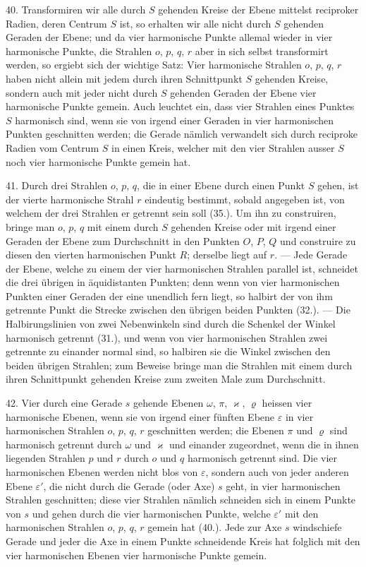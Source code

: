 40. Transformiren wir alle durch $S$ gehenden Kreise
der Ebene mittelst reciproker Radien, deren Centrum $S$ ist,
so erhalten wir alle nicht durch $S$ gehenden Geraden der
Ebene; und da vier harmonische Punkte allemal wieder in
vier harmonische Punkte, die Strahlen $o$, $p$, $q$, $r$ aber in sich
selbst transformirt werden, so ergiebt sich der wichtige
Satz: Vier harmonische Strahlen $o$, $p$, $q$, $r$ haben nicht
allein mit jedem durch ihren Schnittpunkt $S$ gehenden
Kreise, sondern auch mit jeder nicht durch $S$ gehenden Geraden
der Ebene vier harmonische Punkte gemein. Auch
leuchtet ein, dass vier Strahlen eines Punktes $S$ harmonisch
sind, wenn sie von irgend einer Geraden in vier harmonischen
Punkten geschnitten werden; die Gerade n\"amlich verwandelt
sich durch reciproke Radien vom Centrum $S$ in einen Kreis,
welcher mit den vier Strahlen ausser $S$ noch vier harmonische
Punkte gemein hat.

41. Durch drei Strahlen $o$, $p$, $q$, die in einer Ebene
durch einen Punkt $S$ gehen, ist der vierte harmonische Strahl
$r$ eindeutig bestimmt, sobald angegeben ist, von welchem
der drei Strahlen er getrennt sein soll (35.). Um ihn zu
construiren, bringe man $o$, $p$, $q$ mit einem durch $S$ gehenden
Kreise oder mit irgend einer Geraden der Ebene zum Durchschnitt
in den Punkten $O$, $P$, $Q$ und construire zu diesen den
vierten harmonischen Punkt $R$; derselbe liegt auf $r$. --- Jede
Gerade der Ebene, welche zu einem der vier harmonischen
Strahlen parallel ist, schneidet die drei \"ubrigen in \"aquidistanten
Punkten; denn wenn von vier harmonischen Punkten
einer Geraden der eine unendlich fern liegt, so halbirt der
von ihm getrennte Punkt die Strecke zwischen den \"ubrigen
beiden Punkten (32.). --- Die Halbirungslinien von zwei
Nebenwinkeln sind durch die Schenkel der Winkel harmonisch
getrennt (31.), und wenn von vier harmonischen Strahlen
zwei getrennte zu einander normal sind, so halbiren sie
die Winkel zwischen den beiden \"ubrigen Strahlen; zum Beweise
bringe man die Strahlen mit einem durch ihren Schnittpunkt
gehenden Kreise zum zweiten Male zum Durchschnitt.

42. Vier durch eine Gerade $s$ gehende Ebenen $\omega$, $\pi$, $\varkappa$, $\varrho$
heissen {\glqq}vier harmonische Ebenen{\grqq}, wenn sie von irgend
einer f\"unften Ebene $\varepsilon$ in vier harmonischen Strahlen $o$, $p$, $q$, $r$
geschnitten werden; die Ebenen $\pi$ und $\varrho$ sind {\glqq}harmonisch
getrennt{\grqq} durch $\omega$ und $\varkappa$ und einander zugeordnet, wenn die
in ihnen liegenden Strahlen $p$ und $r$ durch $o$ und $q$ harmonisch
getrennt sind. Die vier harmonischen Ebenen werden
nicht blos von $\varepsilon$, sondern auch von jeder anderen Ebene $\varepsilon'$,
die nicht durch die Gerade (oder {\glqq}Axe{\grqq}) $s$ geht, in vier
harmonischen Strahlen geschnitten; diese vier Strahlen n\"amlich
schneiden sich in einem Punkte von $s$ und gehen durch
die vier harmonischen Punkte, welche $\varepsilon'$ mit den harmonischen
Strahlen $o$, $p$, $q$, $r$ gemein hat (40.). Jede zur Axe
$s$ windschiefe Gerade und jeder die Axe in einem Punkte
schneidende Kreis hat folglich mit den vier harmonischen
Ebenen vier harmonische Punkte gemein.


